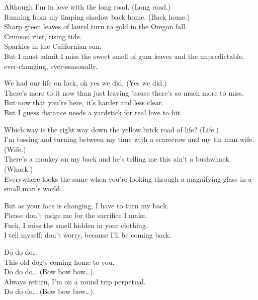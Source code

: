 
Although I'm in love with the long road. (Long road.) \\
Running from my limping shadow back home. (Back home.) \\
Sharp green leaves of laurel turn to gold in the Oregon fall. \\
Crimson rust, rising tide. \\
Sparkles in the Californian sun. \\
But I must admit I miss the sweet smell of gum leaves and the unpredictable, ever-changing, ever-seasonally. \\


We had our life on lock, oh yes we did. (Yes we did.) \\
There's more to it now than just leaving 'cause there's so much more to miss. \\
But now that you're here, it's harder and less clear. \\
But I guess distance needs a yardstick for real love to hit. \\


Which way is the right way down the yellow brick road of life? (Life.) \\
I'm tossing and turning between my time with a scarecrow and my tin man wife. (Wife.) \\
There's a monkey on my back and he's telling me this ain't a bushwhack. (Whack.) \\
Everywhere looks the same when you're looking through a magnifying glass in a small man's world. \\


But as your face is changing, I have to turn my back. \\
Please don't judge me for the sacrifice I make. \\
Fuck, I miss the smell hidden in your clothing. \\
I tell myself: don't worry, because I'll be coming back. \\


Do do do… \\
This old dog's coming home to you. \\
Do do do… (Bow bow bow…). \\
Always return, I'm on a round trip perpetual. \\
Do do do… (Bow bow bow…). \\

